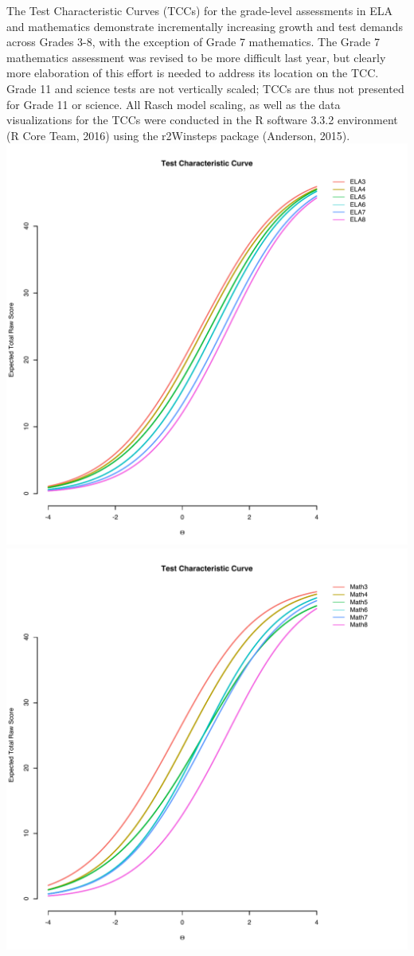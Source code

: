 \documentclass[]{article}
\begin{document}
The Test Characteristic Curves (TCCs) for the grade-level assessments in
ELA and mathematics demonstrate incrementally increasing growth and test
demands across Grades 3-8, with the exception of Grade 7 mathematics.
The Grade 7 mathematics assessment was revised to be more difficult last
year, but clearly more elaboration of this effort is needed to address
its location on the TCC. Grade 11 and science tests are not vertically
scaled; TCCs are thus not presented for Grade 11 or science. All Rasch
model scaling, as well as the data visualizations for the TCCs were
conducted in the R software 3.3.2 environment (R Core Team, 2016) using
the r2Winsteps package (Anderson, 2015). \FloatBarrier
\includegraphics{tccs/ela_tccs.pdf} \includegraphics{tccs/math_tccs.pdf}
\clearpage
\end{document}
